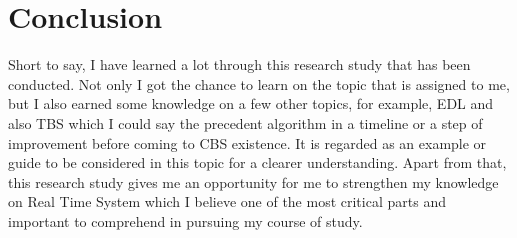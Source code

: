\section{Conclusion}
Short to say, I have learned a lot through this research study that has been conducted. Not only I got the chance to learn on the topic that is assigned to me, but I also earned some knowledge on a few other topics, for example, EDL and also TBS which I could say the precedent algorithm in a timeline or a step of improvement before coming to CBS existence. It is regarded as an example or guide to be considered in this topic for a clearer understanding. Apart from that, this research study gives me an opportunity for me to strengthen my knowledge on Real Time System which I believe one of the most critical parts and important to comprehend in pursuing my course of study.
